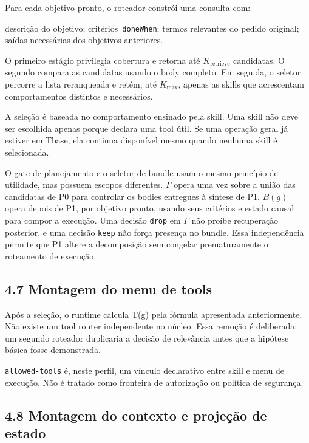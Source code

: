 \documentclass[12pt,a4paper]{article}
\begin{document}
Para cada objetivo pronto, o roteador constrói uma consulta com:


\noindent \textbullet{} descrição do objetivo; \textbullet{} critérios\texttt{ doneWhen}; \textbullet{} termos relevantes do pedido original; \textbullet{} saídas necessárias dos objetivos anteriores.\par

O primeiro estágio privilegia cobertura e retorna até \(K_{\mathrm{retrieve}}\) candidatas. O segundo compara as candidatas usando o body completo. Em seguida, o seletor percorre a lista reranqueada e retém, até \(K_{\max}\), apenas as skills que acrescentam comportamentos distintos e necessários.




A seleção é baseada no comportamento ensinado pela skill. Uma skill não deve ser escolhida apenas porque declara uma tool útil. Se uma operação geral já estiver em Tbase, ela continua disponível mesmo quando nenhuma skill é selecionada.

O gate de planejamento e o seletor de bundle usam o mesmo princípio de utilidade, mas possuem escopos diferentes. \(\Gamma\) opera uma vez sobre a união das candidatas de P0 para controlar os bodies entregues à síntese de P1. \(B(g)\) opera depois de P1, por objetivo pronto, usando seus critérios e estado causal para compor a execução. Uma decisão \texttt{drop} em \(\Gamma\) não proíbe recuperação posterior, e uma decisão \texttt{keep} não força presença no bundle. Essa independência permite que P1 altere a decomposição sem congelar prematuramente o roteamento de execução.



\subsection*{4.7 Montagem do menu de tools}

Após a seleção, o runtime calcula T(g) pela fórmula apresentada anteriormente. Não existe um tool router independente no núcleo. Essa remoção é deliberada: um segundo roteador duplicaria a decisão de relevância antes que a hipótese básica fosse demonstrada.




\texttt{allowed-tools} é, neste perfil, um vínculo declarativo entre skill e menu de execução. Não é tratado como fronteira de autorização ou política de segurança.

\subsection*{4.8 Montagem do contexto e projeção de estado}
\end{document}
